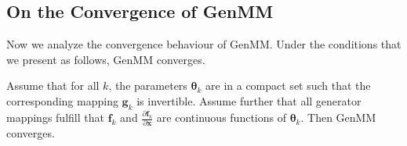 \subsection{On the Convergence of GenMM}
Now we analyze the convergence behaviour of GenMM. Under the conditions that we present as follows, GenMM converges. 

\begin{proposition}
  Assume that for all $k$, the parameters $\bm{\theta}_k$ are in a compact set such that the corresponding mapping $\bm{g}_k$ is invertible. Assume further that all generator mappings fulfill that $\bm{f}_k$ and $\frac{\partial \bm{f}_k}{\partial \bm{x}}$ are continuous functions of $\bm{\theta}_k$. Then GenMM converges. 
\end{proposition}
